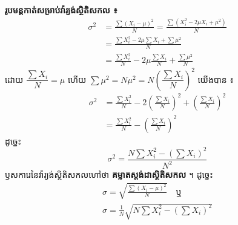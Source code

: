 \textbf{រូបមន្តកាត់សម្រាប់វ៉ារ្យង់ស្ថិតិសកល ៖}
\[
\begin{aligned}
\sigma^2 &= \frac{\sum(X_i - \mu)^2}{N} = \frac{\sum(X_i^2 - 2\mu X_i + \mu^2)}{N}\\
&= \frac{\sum X_i^2 - 2\mu\sum X_i + \sum\mu^2}{N}\\
&= \frac{\sum X_i^2}{N} - 2\mu\frac{\sum X_i}{N} + \frac{\sum\mu^2}{N}
\end{aligned}
\]
ដោយ $\dfrac{\sum X_i}{N} = \mu$ ហើយ $\sum\mu^2 = N\mu^2 = N\left(\dfrac{\sum X_i}{N}\right)^2$ យើងបាន ៖
\[
\begin{aligned}
\sigma^2 &= \frac{\sum X_i^2}{N} - 2\left(\frac{\sum X_i}{N}\right)^2 + \left(\frac{\sum X_i}{N}\right)^2\\
&= \frac{\sum X_i^2}{N} - \left(\frac{\sum X_i}{N}\right)^2
\end{aligned}
\]
ដូច្នេះ
\[
\sigma^2 = \frac{N\sum X_i^2 - \left(\sum X_i\right)^2}{N^2}
\]
ឫសការេនៃវ៉ារ្យង់ស្ថិតិសកលហៅថា \textbf{គម្លាតស្តង់ដាស្ថិតិសកល} ។ ដូច្នេះ
\[
\begin{gathered}
\sigma = \sqrt{\frac{\sum(X_i - \mu)^2}{N}} \quad \text{ឬ}\\
\sigma = \frac{1}{N}\sqrt{N\sum X_i^2 - \left(\sum X_i\right)^2}
\end{gathered}
\]


